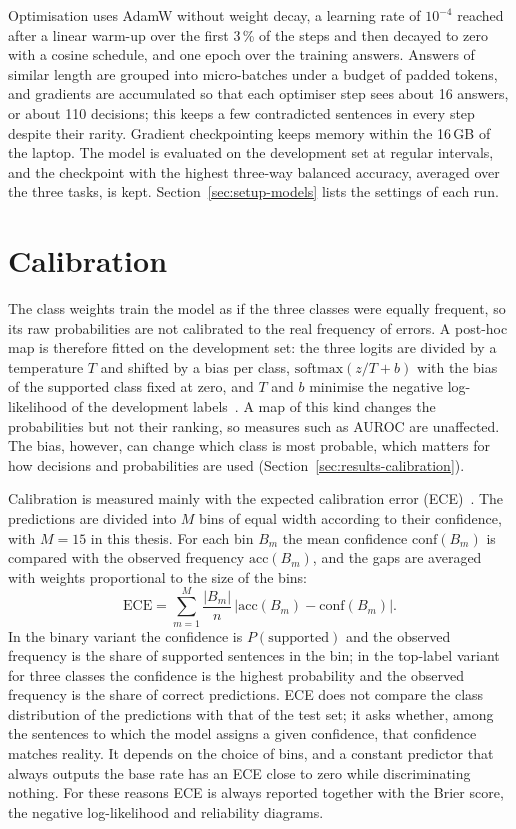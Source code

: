 Optimisation uses AdamW without weight decay, a learning rate of $10^{-4}$ reached after a linear warm-up over the first
3\,\% of the steps and then decayed to zero with a cosine schedule, and one epoch over the training answers. Answers of
similar length are grouped into micro-batches under a budget of padded tokens, and gradients are accumulated so that
each optimiser step sees about 16 answers, or about 110 decisions; this keeps a few contradicted sentences in every
step despite their rarity. Gradient checkpointing keeps memory within the 16\,GB of the laptop. The model is evaluated
on the development set at regular intervals, and the checkpoint with the highest three-way balanced accuracy, averaged
over the three tasks, is kept. Section~\ref{sec:setup-models} lists the settings of each run.

\section{Calibration}
\label{sec:method-calibration}

The class weights train the model as if the three classes were equally frequent, so its raw probabilities are not
calibrated to the real frequency of errors. A post-hoc map is therefore fitted on the development set: the three
logits are divided by a temperature $T$ and shifted by a bias per class, $\mathrm{softmax}(z / T + b)$ with the bias of
the supported class fixed at zero, and $T$ and $b$ minimise the negative log-likelihood of the development
labels~\cite{guo2017calibration}. A map of this kind changes the probabilities but not their ranking, so measures such
as AUROC are unaffected. The bias, however, can change which class is most probable, which matters for how decisions
and probabilities are used (Section~\ref{sec:results-calibration}).

Calibration is measured mainly with the expected calibration error (ECE)~\cite{naeini2015ece,guo2017calibration}. The
predictions are divided into $M$ bins of equal width according to their confidence, with $M = 15$ in this thesis. For
each bin $B_m$ the mean confidence $\mathrm{conf}(B_m)$ is compared with the observed frequency $\mathrm{acc}(B_m)$, and
the gaps are averaged with weights proportional to the size of the bins:
\begin{equation}
  \mathrm{ECE} = \sum_{m=1}^{M} \frac{|B_m|}{n} \, \bigl| \mathrm{acc}(B_m) - \mathrm{conf}(B_m) \bigr| .
\end{equation}
In the binary variant the confidence is $P(\text{supported})$ and the observed frequency is the share of supported
sentences in the bin; in the top-label variant for three classes the confidence is the highest probability and the
observed frequency is the share of correct predictions. ECE does not compare the class distribution of the predictions
with that of the test set; it asks whether, among the sentences to which the model assigns a given confidence, that
confidence matches reality. It depends on the choice of bins, and a constant predictor that always outputs the base
rate has an ECE close to zero while discriminating nothing. For these reasons ECE is always reported together with the
Brier score, the negative log-likelihood and reliability diagrams.

